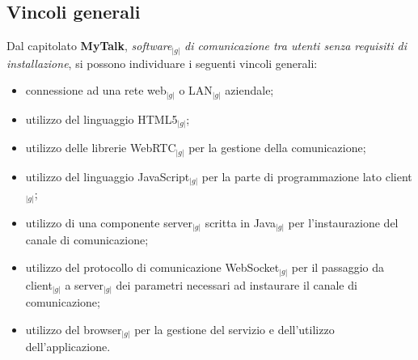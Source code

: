 	\subsection{Vincoli generali}
		Dal capitolato \textbf{MyTalk}, \textit{software}$_{|g|}$ \textit{di comunicazione tra utenti senza requisiti  di installazione}, si possono 
		individuare i seguenti vincoli generali:
		\begin{itemize}
			\item connessione ad una rete web$_{|g|}$ o LAN$_{|g|}$ aziendale;
			\item utilizzo del linguaggio HTML5$_{|g|}$;
			\item utilizzo delle librerie WebRTC$_{|g|}$ per la gestione della comunicazione;
			\item utilizzo del linguaggio JavaScript$_{|g|}$ per la parte di programmazione lato client$_{|g|}$;
			\item utilizzo di una componente server$_{|g|}$ scritta in Java$_{|g|}$ per l'instaurazione del canale di comunicazione;
			\item utilizzo del protocollo di comunicazione WebSocket$_{|g|}$ per il passaggio da client$_{|g|}$ a server$_{|g|}$ 
			dei parametri necessari ad instaurare il canale di comunicazione;
			\item utilizzo del browser$_{|g|}$ per la gestione del servizio e dell'utilizzo dell'applicazione.
		\end{itemize}
\newpage
